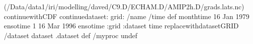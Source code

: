 \begin{ingrid}
(/Data/data1/iri/modelling/daved/C9.D/ECHAM.D/AMIP2h.D/grads.lats.nc) continuewithCDF
continuedataset: 
grid:
/name /time def
monthtime
16 Jan 1979 ensotime
1
16 Mar 1996 ensotime
:grid
:dataset
time replacewithdatasetGRID
/dataset dataset .dataset def
/myproc undef
\end{ingrid}
